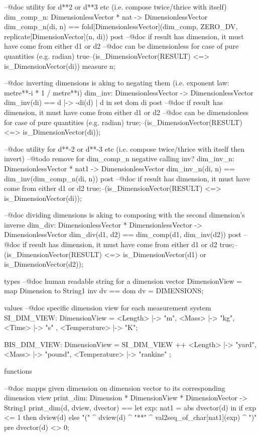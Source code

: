 \documentclass[a4paper]{article}
\begin{document}
\begin{vdm_al}
  --@doc utility for d**2 or d**3 etc (i.e. compose twice/thrice with itself)
  dim_comp_n: DimensionlessVector * nat -> DimensionlessVector
  dim_comp_n(di, n) == 
   fold[DimensionlessVector](dim_comp, ZERO_DV, replicate[DimensionVector](n, di)) 
 post 
  --@doc if result has dimension, it must have come from either d1 or d2
  --@doc can be dimensionless for case of pure quantities (e.g. radian)
  true--(is_DimensionVector(RESULT) <=> is_DimensionVector(di))
 measure
  n;
            
 --@doc inverting dimensions is aking to negating them (i.e. exponent law: metre**-i * 1 / metre**i)
 dim_inv: DimensionlessVector -> DimensionlessVector
 dim_inv(di) == { d |-> -di(d) | d in set dom di }
 post 
  --@doc if result has dimension, it must have come from either d1 or d2
  --@doc can be dimensionless for case of pure quantities (e.g. radian)
  true;--(is_DimensionVector(RESULT) <=> is_DimensionVector(di));
        
 --@doc utility for d**-2 or d**-3 etc (i.e. compose twice/thrice with itself then invert)
 --@todo remove for dim_comp_n negative calling inv?
 dim_inv_n: DimensionlessVector * nat1 -> DimensionlessVector
 dim_inv_n(di, n) == dim_inv(dim_comp_n(di, n))
 post 
  --@doc if result has dimension, it must have come from either d1 or d2
  true;--(is_DimensionVector(RESULT) <=> is_DimensionVector(di));

 --@doc dividing dimensions is aking to composing with the second dimension's inverse 
 dim_div: DimensionlessVector * DimensionlessVector -> DimensionlessVector
 dim_div(d1, d2) == dim_comp(d1, dim_inv(d2))
 post 
  --@doc if result has dimension, it must have come from either d1 or d2
  true;--(is_DimensionVector(RESULT) <=> is_DimensionVector(d1) or is_DimensionVector(d2));
        
types 
 --@doc human readable string for a dimension vector
 DimensionView = map Dimension to String1
 inv dv == dom dv = DIMENSIONS;

values 
 --@doc specific dimension view for each measurement system
 SI_DIM_VIEW: DimensionView = 
  {<Length> |-> "m", <Mass> |-> "kg", <Time> |-> "s" , <Temperature> |-> "K"};

 BIS_DIM_VIEW: DimensionView = SI_DIM_VIEW ++ 
  {<Length> |-> "yard", <Mass> |-> "pound", <Temperature> |-> "rankine" };

functions

 --@doc mapps given dimension on dimension vector to its corresponding dimension view
 print_dim: Dimension * DimensionView * DimensionVector -> String1 
 print_dim(d, dview, dvector) ==
  let exp: nat1 = abs dvector(d) in
   if exp <= 1 then 
    dview(d)
   else 
    "(" ^ dview(d) ^ "**" ^ val2seq_of_char[nat1](exp) ^ ")"  
 pre dvector(d) <> 0;


\end{vdm_al}
\end{document}
